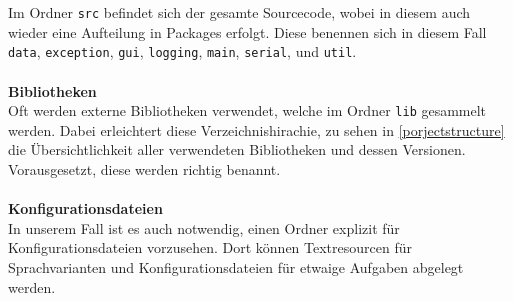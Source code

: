 Im Ordner \lstinline{src} befindet sich der gesamte Sourcecode, wobei in diesem auch wieder eine Aufteilung in Packages erfolgt.
Diese benennen sich in diesem Fall \lstinline{data}, \lstinline{exception}, \lstinline{gui}, \lstinline{logging}, \lstinline{main}, \lstinline{serial}, und \lstinline{util}.
\\\\
\textbf{Bibliotheken}
\\
Oft werden externe Bibliotheken verwendet, welche im Ordner \lstinline{lib} gesammelt werden.
Dabei erleichtert diese Verzeichnishirachie, zu sehen in \autoref{porjectstructure} die Übersichtlichkeit aller verwendeten Bibliotheken und dessen Versionen.
Vorausgesetzt, diese werden richtig benannt.
\\\\
\textbf{Konfigurationsdateien}
\\
In unserem Fall ist es auch notwendig, einen Ordner explizit für Konfigurationsdateien vorzusehen.
Dort können Textresourcen für Sprachvarianten und Konfigurationsdateien für etwaige Aufgaben abgelegt werden.

